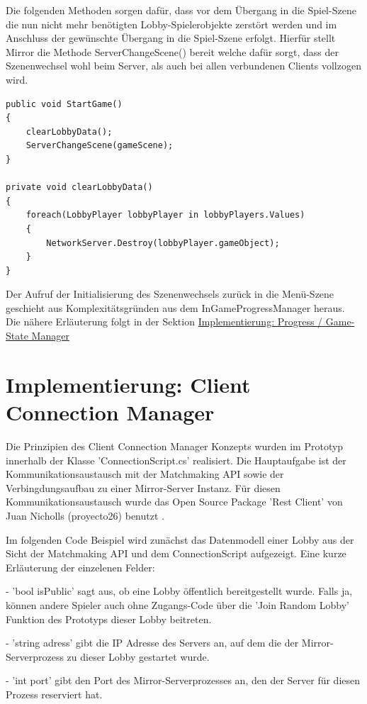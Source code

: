 Die folgenden Methoden sorgen dafür, dass vor dem Übergang in die Spiel-Szene die nun nicht mehr benötigten Lobby-Spielerobjekte zerstört werden und im Anschluss der gewünschte Übergang in die Spiel-Szene erfolgt. Hierfür stellt Mirror die Methode ServerChangeScene() bereit welche dafür sorgt, dass der Szenenwechsel wohl beim Server, als auch bei allen verbundenen Clients vollzogen wird.

\begin{lstlisting}[caption= GameNetworkManager.cs StartGame]
public void StartGame()
{
	clearLobbyData();
	ServerChangeScene(gameScene);
}

private void clearLobbyData()
{
	foreach(LobbyPlayer lobbyPlayer in lobbyPlayers.Values)
	{
		NetworkServer.Destroy(lobbyPlayer.gameObject);
	}
}
\end{lstlisting}

Der Aufruf der Initialisierung des Szenenwechsels zurück in die Menü-Szene geschieht aus Komplexitätsgründen aus dem InGameProgressManager heraus. Die nähere Erläuterung folgt in der Sektion \hyperref[Progress Manager]{Implementierung: Progress / Game-State Manager}

\section{Implementierung: Client Connection Manager}

Die Prinzipien des Client Connection Manager Konzepts wurden im Prototyp innerhalb der Klasse 'ConnectionScript.cs' realisiert. Die Hauptaufgabe ist der Kommunikationsaustausch mit der Matchmaking API sowie der Verbingdungsaufbau zu einer Mirror-Server Instanz. Für diesen Kommunikationsaustausch wurde das Open Source Package 'Rest Client' von Juan Nicholls (proyecto26) benutzt \cite{GitHub.10.02.2022}.

Im folgenden Code Beispiel wird zunächst das Datenmodell einer Lobby aus der Sicht der Matchmaking API und dem ConnectionScript aufgezeigt. Eine kurze Erläuterung der einzelenen Felder:

- 'bool isPublic' sagt aus, ob eine Lobby öffentlich bereitgestellt wurde. Falls ja, können andere Spieler auch ohne Zugangs-Code über die 'Join Random Lobby' Funktion des Prototyps dieser Lobby beitreten.

- 'string adress' gibt die IP Adresse des Servers an, auf dem die der Mirror-Serverprozess zu dieser Lobby gestartet wurde.

- 'int port' gibt den Port des Mirror-Serverprozesses an, den der Server für diesen Prozess reserviert hat.

